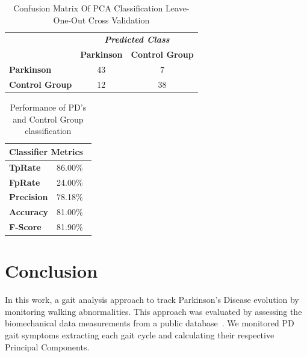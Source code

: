 \documentclass[10pt, conference, compsocconf]{IEEEtran}
\begin{document}
\begin{table}[!htbp]
\caption{Confusion Matrix Of PCA Classification Leave-One-Out Cross Validation}
\label{table:resultadomatrizconfusaosvm}
\centering
\begin{tabular}{l|c|c|}
\cline{2-3}
\multicolumn{1}{c}{}                         & \multicolumn{2}{|c|}{\textit{\textbf{Predicted Class}}} \\ \cline{2-3} 
                                             & \textbf{Parkinson}      & \textbf{Control Group}         \\ \hline
\multicolumn{1}{|l|}{\textbf{Parkinson}} & 43       & 7          \\ \hline
\multicolumn{1}{|l|}{\textbf{Control Group}}     & 12           & 38     \\ \hline
\end{tabular}
\end{table}


\begin{table}[htbp!]
\caption{Performance of PD's and Control Group classification}
\label{table:metricas}
\centering
\begin{tabular}{|l|r|}
\hline
\multicolumn{2}{|l|}{\textbf{Classifier Metrics}} \\ \hline
\textbf{TpRate}                    & 86.00$\%$\                 \\ \hline
\textbf{FpRate}                    & 24.00$\%$\                \\ \hline
\textbf{Precision}                 & 78.18$\%$\                \\ \hline
\textbf{Accuracy}                  & 81.00$\%$\                \\ \hline
\textbf{F-Score}                 & 81.90$\%$\                \\ \hline
\end{tabular}
\end{table}


\section{Conclusion}\label{sec:conclusion}

In this work, a gait analysis approach to track Parkinson's Disease evolution by monitoring walking abnormalities. This approach was evaluated by assessing the biomechanical data measurements from a public database~\cite{physionet}. We monitored PD gait symptoms extracting each gait cycle and calculating their respective Principal Components.  
\end{document}
